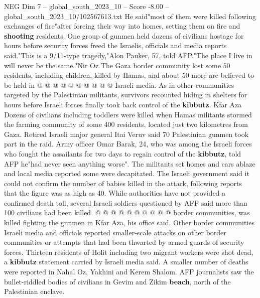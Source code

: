 \begin{textsample}{NEG Dim 7 – global\_south\_2023\_10 – Score -8.00 – global\_south\_2023\_10/102567613.txt}
He said"most of them were killed following exchanges of fire"after forcing their way into homes, setting them on fire and \textbf{shooting} residents.
One group of gunmen held dozens of civilians hostage for hours before security forces freed the Israelis, officials and media reports said."This is a 9/11-type tragedy,"Alon Pauker, 57, told AFP."The place I live in will never be the same."Nir Oz The Gaza border community lost some 50 residents, including children, killed by Hamas, and about 50 more are believed to be held in @ @ @ @ @ @ @ @ @ @ Israeli media.
As in other communities targeted by the Palestinian militants, survivors recounted hiding in shelters for hours before Israeli forces finally took back control of the \textbf{kibbutz}.
Kfar Aza Dozens of civilians including toddlers were killed when Hamas militants stormed the farming community of some 400 residents, located just two kilometres from Gaza.
Retired Israeli major general Itai Veruv said 70 Palestinian gunmen took part in the raid.
Army officer Omar Barak, 24, who was among the Israeli forces who fought the assailants for two days to regain control of the \textbf{kibbutz}, told AFP he"had never seen anything worse".
The militants set homes and cars ablaze and local media reported some were decapitated.
The Israeli government said it could not confirm the number of babies killed in the attack, following reports that the figure was as high as 40.
While authorities have not provided a confirmed death toll, several Israeli soldiers questioned by AFP said more than 100 civilians had been killed. @ @ @ @ @ @ @ @ @ @ border communities, was killed fighting the gunmen in Kfar Aza, his office said.
Other border communities Israeli media and officials reported smaller-scale attacks on other border communities or attempts that had been thwarted by armed guards of security forces.
Thirteen residents of Holit including two migrant workers were shot dead, a \textbf{kibbutz} statement carried by Israeli media said.
A smaller number of deaths were reported in Nahal Oz, Yakhini and Kerem Shalom.
AFP journalists saw the bullet-riddled bodies of civilians in Gevim and Zikim \textbf{beach}, north of the Palestinian enclave.

\end{textsample}
